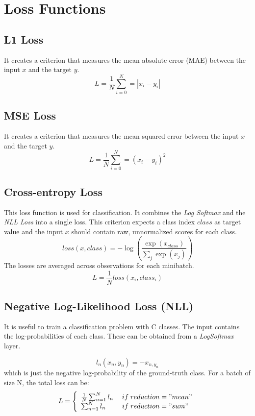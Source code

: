 \section{Loss Functions}

\subsection{L1 Loss}
It creates a criterion that measures the mean absolute error (MAE) between the input $x$ and the target $y$.
\begin{equation}
    L = \frac{1}{N} \sum_{i=0}^{N} = |x_i - y_i|
\end{equation}

\subsection{MSE Loss}
It creates a criterion that measures the mean squared error between the input $x$ and the target $y$.
\begin{equation}
    L =  \frac{1}{N} \sum_{i=0}^{N} = (x_i - y_i)^2
\end{equation}

\subsection{Cross-entropy Loss}
This loss function is used for classification. It combines the \textit{Log Softmax} and the \textit{NLL Loss} into a single loss. 
This criterion expects a class index $class$ as target value and the input $x$ should contain raw, unnormalized scores for each class.
\begin{equation}
    loss(x, class) = -\log \left(\frac{\exp(x_{class})}{\sum_j \exp(x_j)}\right)
\end{equation}
The losses are averaged across observations for each minibatch.
\begin{equation}
    L = \frac{1}{N} loss(x_i, class_i)
\end{equation}

\subsection{Negative Log-Likelihood Loss (NLL)}
 It is useful to train a classification problem with C classes.
 The input contains the log-probabilities of each class. These can be obtained from a \textit{LogSoftmax} layer.
 
 \begin{equation}
    l_n(x_n, y_n) = -x_{n, y_n} 
 \end{equation}
which is just the negative log-probability of the ground-truth class.
For a batch of size N, the total loss can be:
\begin{equation}
    L = \left\{ \begin{array}{ll}
        \frac{1}{N}\sum_{n=1}^{N} l_n &\;if\;reduction="mean" \\
        \sum_{n=1}^{N} l_n &\;if\;reduction="sum"
    \end{array}\right.
\end{equation}

